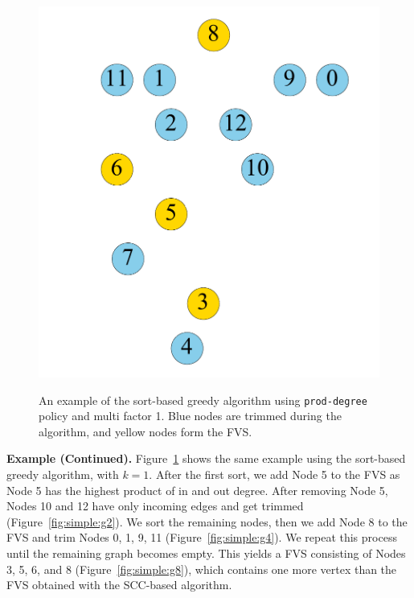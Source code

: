 \begin{figure}[t]
\begin{minipage}[b]{0.19\linewidth}
	\end{minipage}                  
	\begin{minipage}[b]{0.19\linewidth}
		\centering
		{\includegraphics[width=\textwidth]{./alg_fig/simple-g8}}
	\end{minipage}
	\caption{An example of the sort-based greedy algorithm using \texttt{prod-degree} policy and multi factor 1. Blue nodes are trimmed during the algorithm, and yellow nodes form the FVS.}
	\label{fig:simple}               
\end{figure}

{\bf Example (Continued).} Figure~\ref{fig:simple} shows the same example using the sort-based greedy algorithm, with $k = 1$. After the first sort, we add Node 5 to the FVS as Node 5 has the highest product of in and out degree. After removing Node 5, Nodes 10 and 12 have only incoming edges and get trimmed (Figure~\ref{fig:simple:g2}). We sort the remaining nodes, then we add Node 8 to the FVS and trim Nodes 0, 1, 9, 11 (Figure~\ref{fig:simple:g4}). We repeat this process until the remaining graph becomes empty. This yields a FVS consisting of Nodes 3, 5, 6, and 8 (Figure~\ref{fig:simple:g8}), which contains one more vertex than the FVS obtained with the SCC-based algorithm.

